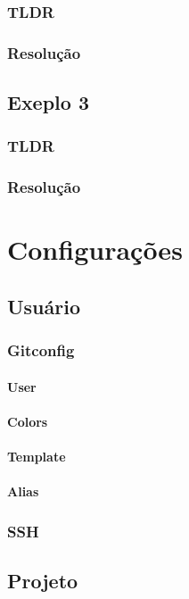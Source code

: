\documentclass{apostila}
\begin{document}
\subsection{TLDR}
\subsection{Resolução}
\section{Exeplo 3}
\subsection{TLDR}
\subsection{Resolução}


\chapter{Configurações}
\section{Usuário}
\subsection{Gitconfig}
\subsubsection{User}
\subsubsection{Colors}
\subsubsection{Template}
\subsubsection{Alias}
\subsection{SSH}

\section{Projeto}
\end{document}
